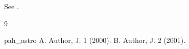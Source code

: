 \documentclass{elsart}
\begin{document}
See \cite{a,b}.
\begin{thebibliography}{9}
\begin{subbibitems}{pah_astro}
 A. Author, J. 1 (2000).
 B. Author, J. 2 (2001).
\end{subbibitems}
\end{thebibliography}
\end{document}
